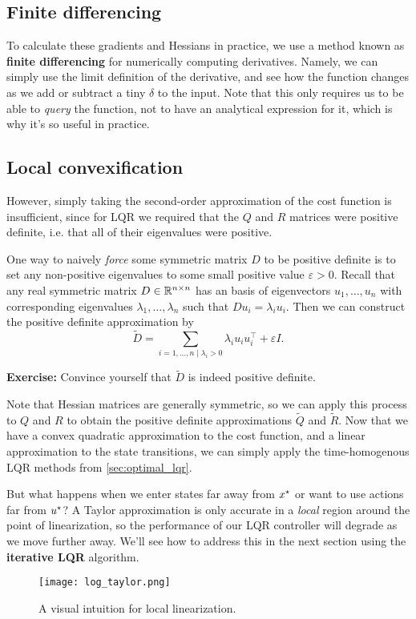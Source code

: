 \documentclass[\main/main]{subfiles}
\begin{document}
\subsection{Finite differencing}

To calculate these gradients and Hessians in practice,
we use a method known as \textbf{finite differencing} for numerically computing derivatives.
Namely, we can simply use the limit definition of the derivative,
and see how the function changes as we add or subtract a tiny $\delta$ to the input.
Note that this only requires us to be able to \emph{query} the function, not to have an analytical expression for it,
which is why it's so useful in practice.

\subsection{Local convexification}

However, simply taking the second-order approximation of the cost function is insufficient,
since for LQR we required that the $Q$ and $R$ matrices were positive definite, i.e. that all of their eigenvalues were positive.

One way to naively \emph{force} some symmetric matrix $D$ to be positive definite is to set any non-positive eigenvalues to some small positive value $\varepsilon > 0$.
Recall that any real symmetric matrix $D \in \mathbb{R}^{n \times n}$ has an basis of eigenvectors $u_1, \dots, u_n$ with corresponding eigenvalues $\lambda_1, \dots, \lambda_n$ such that $D u_i = \lambda_i u_i$. Then we can construct the positive definite approximation by \[
    \widetilde{D} = \sum_{i=1, \dots, n \mid \lambda_i > 0} \lambda_i u_i u_i^\top + \varepsilon I.
\]

\textbf{Exercise:} Convince yourself that $\widetilde{D}$ is indeed positive definite.

Note that Hessian matrices are generally symmetric, so we can apply this process to $Q$ and $R$ to obtain the positive definite approximations $\widetilde{Q}$ and $\widetilde{R}$. Now that we have a convex quadratic approximation to the cost function, and a linear approximation to the state transitions, we can simply apply the time-homogenous LQR methods from \autoref{sec:optimal_lqr}.


But what happens when we enter states far away from $x^\star$ or want to use actions far from $u^\star$?
A Taylor approximation is only accurate in a \emph{local} region around the point of linearization,
so the performance of our LQR controller will degrade as we move further away.
We'll see how to address this in the next section using the \textbf{iterative LQR} algorithm.
\begin{figure}[h]
    \centering
    \texttt{[image: log\_taylor.png]}
    \caption{A visual intuition for local linearization.}
    \label{fig:local_linearization}
\end{figure}
\end{document}
